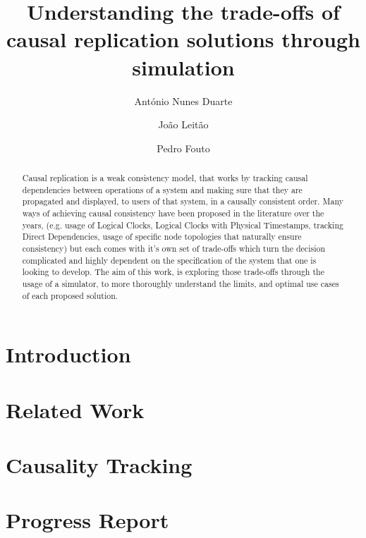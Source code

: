 \documentclass[runningheads]{llncs}
\begin{document}
%
\title{Understanding the trade-offs of causal replication solutions through simulation}
%
%
\author{António Nunes Duarte \and
João Leitão \and
Pedro Fouto}
%
%
%
\maketitle              %
%
\begin{abstract}
Causal replication is a weak consistency model, that works by 
tracking causal dependencies between operations of a system and making sure that they are propagated
and displayed, to users of that system, in a causally consistent order.
Many ways of achieving causal consistency have been proposed in the literature
over the years, (e.g.
usage of Logical Clocks\cite{baquero2016logical},
Logical Clocks with Physical Timestamps\cite{roohitavaf2017causalspartan,du2014gentlerain}, tracking Direct Dependencies\cite{lloyd2011don}, 
	usage of specific node topologies that naturally ensure consistency\cite{van2020intrinsic})
but each comes with it's own set of trade-offs which turn the decision complicated 
and	highly dependent on the specification of the system that one is looking to develop.
The aim of this work, is
exploring those trade-offs through the usage of a simulator, to more thoroughly understand the limits,
and optimal use cases of each proposed solution.

\end{abstract}

\section{Introduction}

\section{Related Work}

\section{Causality Tracking}

\section{Progress Report}

%
%
%
% 
% 
%



\end{document}
